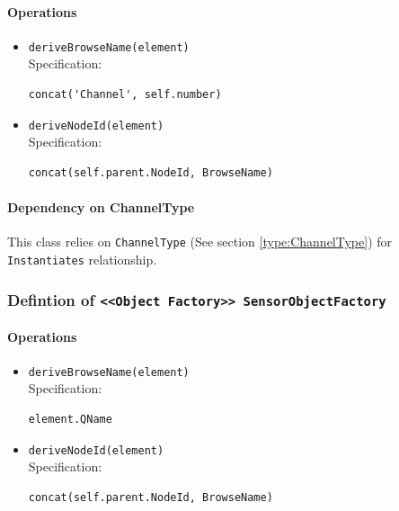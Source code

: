 \paragraph{Operations}
\begin{itemize}
  \item \texttt{deriveBrowseName(element)}\\
    Specification:
   \indent \begin{Verbatim}[xleftmargin=.25in,fontsize=\small]
concat('Channel', self.number)
\end{Verbatim}

  \item \texttt{deriveNodeId(element)}\\
    Specification:
   \indent \begin{Verbatim}[xleftmargin=.25in,fontsize=\small]
concat(self.parent.NodeId, BrowseName)
\end{Verbatim}

\end{itemize}
\paragraph{Dependency on ChannelType}

This class relies on \texttt{ChannelType} (See section \ref{type:ChannelType}) for \texttt{Instantiates} relationship.

\FloatBarrier
\subsubsection{Defintion of \texttt{<<Object Factory>> SensorObjectFactory}} \label{type:SensorObjectFactory}

\FloatBarrier



\paragraph{Operations}
\begin{itemize}
  \item \texttt{deriveBrowseName(element)}\\
    Specification:
   \indent \begin{Verbatim}[xleftmargin=.25in,fontsize=\small]
element.QName
\end{Verbatim}

  \item \texttt{deriveNodeId(element)}\\
    Specification:
   \indent \begin{Verbatim}[xleftmargin=.25in,fontsize=\small]
concat(self.parent.NodeId, BrowseName)
\end{Verbatim}

\end{itemize}
